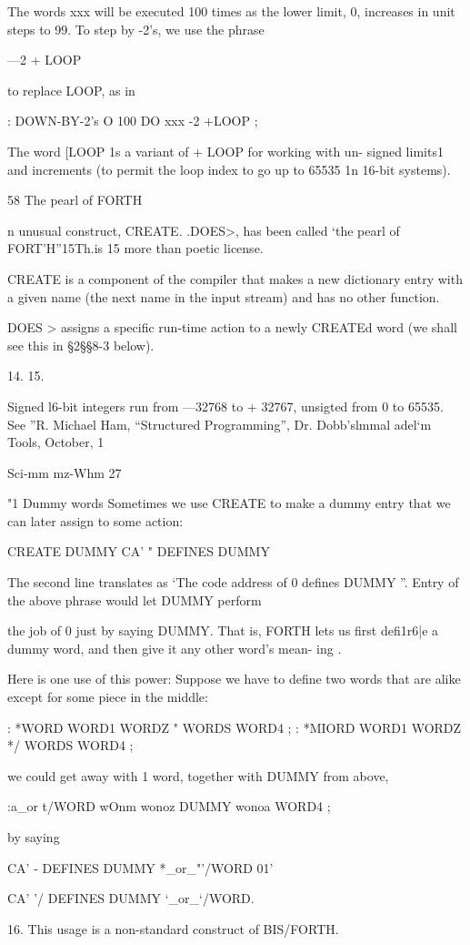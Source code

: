 The words xxx will be executed 100 times as the lower limit, 0,
increases in unit steps to 99. To step by -2's, we use the phrase

—2 + LOOP

to replace LOOP, as in

: DOWN-BY-2's O 100 DO xxx -2 +LOOP ;

The word [LOOP 1s a variant of + LOOP for working with un-
signed limits1 and increments (to permit the loop index to go up
to 65535 1n 16-bit systems).

58 The pearl of FORTH

n unusual construct, CREATE. .DOES>, has been called
‘the pearl of FORT'H”15Th.is 15 more than poetic license.

CREATE is a component of the compiler that makes a new
dictionary entry with a given name (the next name in the input
stream) and has no other function.

DOES > assigns a speciﬁc run-time action to a newly CREATEd
word (we shall see this in §2§§8-3 below).

 

14.
15.

Signed l6-bit integers run from —32768 to + 32767, unsigted from 0 to 65535. See ”R.
Michael Ham, “Structured Programming”, Dr. Dobb’slmmal adel‘m Tools, October, 1%

Sci-mm mz-Whm 27

"1 Dummy words
Sometimes we use CREATE to make a dummy entry that we
can later assign to some action:

CREATE DUMMY
CA' " DEFINES DUMMY

The second line translates as ‘The code address of 0 deﬁnes
DUMMY ”. Entry of the above phrase would let DUMMY perform

the job of 0 just by saying DUMMY. That is, FORTH lets us first
deﬁ1r6|e a dummy word, and then give it any other word’s mean-
ing .

Here is one use of this power: Suppose we have to deﬁne two
words that are alike except for some piece in the middle:

: *WORD WORD1 WORDZ " WORDS WORD4 ;
: *MIORD WORD1 WORDZ */ WORDS WORD4 ;

we could get away with 1 word, together with DUMMY from
above,

:a_or t/WORD
wOnm wonoz
DUMMY
wonoa WORD4 ;

by saying

CA' - DEFINES DUMMY *_or_"'/WORD
01'

CA' '/ DEFINES DUMMY ‘_or_‘/WORD.

 

16. This usage is a non-standard construct of BIS/FORTH.

